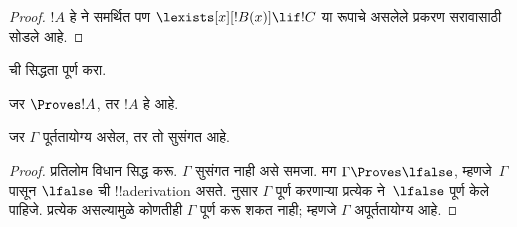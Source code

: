 \documentclass[../../../include/open-logic-section]{subfiles}
\begin{document}
\begin{proof}
{$!A$ हे \QR ने समर्थित पण $\lexists[x][!B(x)] \lif !C$ या रूपाचे असलेले
प्रकरण सरावासाठी सोडले आहे.}{}
\end{proof}

\begin{prob}
   ची सिद्धता पूर्ण करा.
\end{prob}
\tagendprob

\begin{cor}
जर $\Proves !A$, तर $!A$ हे  आहे.
\end{cor}

\begin{cor}
जर $\Gamma$ पूर्ततायोग्य असेल, तर तो सुसंगत आहे.
\end{cor}

\begin{proof}
प्रतिलोम विधान सिद्ध करू. $\Gamma$ सुसंगत नाही असे समजा. मग
$\Gamma \Proves \lfalse$, म्हणजे~$\Gamma$ पासून $\lfalse$ ची
!!a{derivation} असते.  नुसार $\Gamma$ पूर्ण करणाऱ्या
प्रत्येक
ने~$\lfalse$ पूर्ण केले पाहिजे. प्रत्येक
 असल्यामुळे कोणतीही
 $\Gamma$ पूर्ण करू शकत नाही;
म्हणजे $\Gamma$ अपूर्ततायोग्य आहे.
\end{proof}
\end{document}
